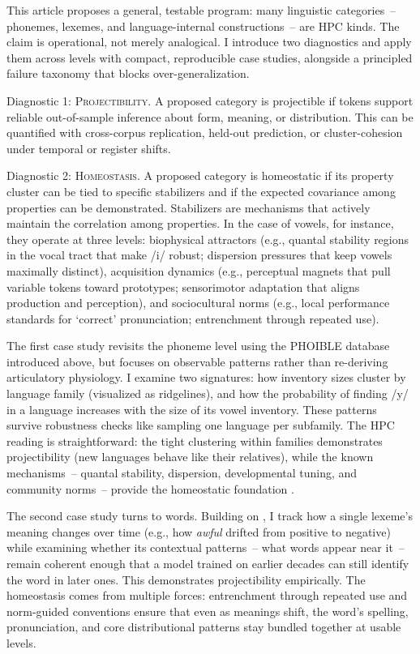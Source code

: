 \documentclass[12pt]{article}
\begin{document}
This article proposes a general, testable program: many linguistic categories~-- phonemes, lexemes, and language-internal constructions~-- are HPC kinds. The claim is operational, not merely analogical. I introduce two diagnostics and apply them across levels with compact, reproducible case studies, alongside a principled failure taxonomy that blocks over-generalization.

Diagnostic 1: \textsc{Projectibility}. A proposed category is projectible if tokens support reliable out-of-sample inference about form, meaning, or distribution. This can be quantified with cross-corpus replication, held-out prediction, or cluster-cohesion under temporal or register shifts.

Diagnostic 2: \textsc{Homeostasis}. A proposed category is homeostatic if its property cluster can be tied to specific stabilizers and if the expected covariance among properties can be demonstrated. Stabilizers are mechanisms that actively maintain the correlation among properties. In the case of vowels, for instance, they operate at three levels: biophysical attractors (e.g., quantal stability regions in the vocal tract that make /i/ robust; dispersion pressures that keep vowels maximally distinct), acquisition dynamics (e.g., perceptual magnets that pull variable tokens toward prototypes; sensorimotor adaptation that aligns production and perception), and sociocultural norms (e.g., local performance standards for `correct' pronunciation; entrenchment through repeated use).

The first case study revisits the phoneme level using the PHOIBLE database introduced above, but focuses on observable patterns rather than re-deriving articulatory physiology. I examine two signatures: how inventory sizes cluster by language family (visualized as ridgelines), and how the probability of finding /y/ in a language increases with the size of its vowel inventory. These patterns survive robustness checks like sampling one language per subfamily. The HPC reading is straightforward: the tight clustering within families demonstrates projectibility (new languages behave like their relatives), while the known mechanisms~-- quantal stability, dispersion, developmental tuning, and community norms~-- provide the homeostatic foundation \citep{Ekstrom2025PhonemeTool}.

The second case study turns to words. Building on \citet{Miller2021WordsSpeciesKinds}, I track how a single lexeme's meaning changes over time (e.g., how \textit{awful} drifted from positive to negative) while examining whether its contextual patterns~-- what words appear near it~-- remain coherent enough that a model trained on earlier decades can still identify the word in later ones. This demonstrates projectibility empirically. The homeostasis comes from multiple forces: entrenchment through repeated use and norm-guided conventions ensure that even as meanings shift, the word's spelling, pronunciation, and core distributional patterns stay bundled together at usable levels.
\end{document}
